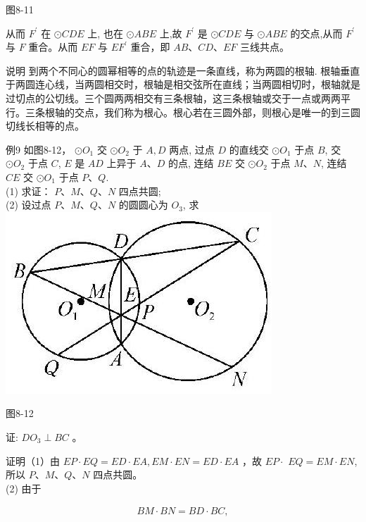 \documentclass[10pt]{article}
\begin{document}
图8-11

从而 $F^{\prime}$ 在 $\odot C D E$ 上, 也在 $\odot A B E$ 上,故 $F^{\prime}$ 是 $\odot C D E$ 与 $\odot A B E$ 的交点,从而 $F^{\prime}$ 与 $F$ 重合。从而 $E F$ 与 $E F^{\prime}$ 重合，即 $A B 、 C D 、 E F$ 三线共点。

说明 到两个不同心的圆幂相等的点的轨迹是一条直线，称为两圆的根轴. 根轴垂直于两圆连心线，当两圆相交时，根轴是相交弦所在直线；当两圆相切时，根轴就是过切点的公切线。三个圆两两相交有三条根轴，这三条根轴或交于一点或两两平行。三条根轴的交点，我们称为根心。根心若在三圆外部，则根心是唯一的到三圆切线长相等的点。

例9 如图8-12， $\odot O_{1}$ 交 $\odot O_{2}$ 于 $A, D$ 两点, 过点 $D$ 的直线交 $\odot O_{1}$ 于点 $B$, 交 $\odot O_{2}$ 于点 $C$, $E$ 是 $A D$ 上异于 $A 、 D$ 的点, 连结 $B E$ 交 $\odot O_{2}$ 于点 $M 、 N$, 连结 $C E$ 交 $\odot O_{1}$ 于点 $P 、 Q$.\\
(1) 求证： $P 、 M 、 Q 、 N$ 四点共圆;\\
(2) 设过点 $P 、 M 、 Q 、 N$ 的圆圆心为 $O_{3}$, 求\\
\includegraphics[max width=\textwidth, center]{2024_10_30_66b8e5e701da2093c133g-062(1)}

图8-12

证: $D O_{3} \perp B C$ 。

证明（1）由 $E P \cdot E Q=E D \cdot E A, E M \cdot E N=E D \cdot E A$ ，故 $E P \cdot$ $E Q=E M \cdot E N$, 所以 $P 、 M 、 Q 、 N$ 四点共圆。\\
(2) 由于

\begin{align*}
B M \cdot B N=B D \cdot B C,
\end{align*}
\end{document}

